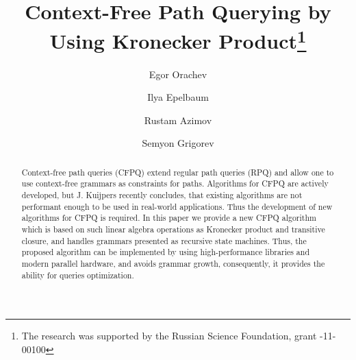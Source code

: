 \documentclass[runningheads,table]{llncs}
\begin{document}
%
\title{Context-Free Path Querying by Using Kronecker Product\thanks{The research was supported by the Russian Science Foundation, grant -11-00100}}
%
%
\author{Egor Orachev \and
Ilya Epelbaum \and
Rustam Azimov \and
Semyon Grigorev}
%
%
%
\maketitle              %
%
\begin{abstract}
Context-free path queries (CFPQ) extend regular path queries (RPQ) and allow one to use context-free grammars as constraints for paths. Algorithms for CFPQ are actively developed, but J. Kuijpers recently concludes, that existing algorithms are not performant enough to be used in real-world applications. Thus the development of new algorithms for CFPQ is required. In this paper we provide a new CFPQ algorithm which is based on such linear algebra operations as Kronecker product and transitive closure, and handles grammars presented as recursive state machines. Thus, the proposed algorithm can be implemented by using high-performance libraries and modern parallel hardware, and avoids grammar growth, consequently, it provides the ability for queries optimization.


\end{abstract}
%
%
%







%
%
%
 
 
\end{document}
